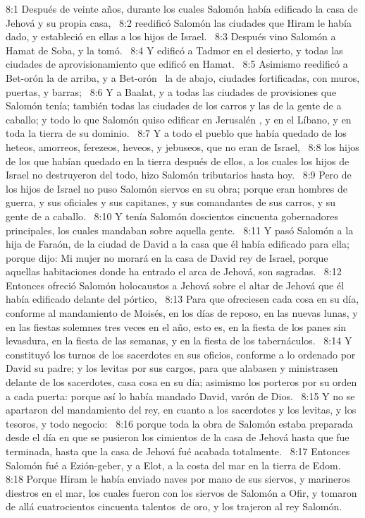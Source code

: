 								
								8:1 Después de veinte años, durante los cuales Salomón había edificado la casa de Jehová y su propia casa,  
								8:2 reedificó Salomón las ciudades que Hiram le había dado, y estableció en ellas a los hijos de Israel.  
								8:3 Después vino Salomón a Hamat de Soba, y la tomó.  
								8:4 Y edificó a Tadmor en el desierto, y todas las ciudades de aprovisionamiento que edificó en Hamat.  
								8:5 Asimismo reedificó a Bet-orón la de arriba, y a Bet-orón  la de abajo, ciudades fortificadas, con muros, puertas, y barras;  
								8:6 Y a Baalat, y a todas las ciudades de provisiones que Salomón tenía; también todas las ciudades de los carros y las de la gente de a caballo; y todo lo que Salomón quiso edificar en Jerusalén , y en el Líbano, y en toda la tierra de su dominio.  
								8:7 Y a todo el pueblo que había quedado de los heteos, amorreos, ferezeos, heveos, y jebuseos, que no eran de Israel,  
								8:8 los hijos de los que habían quedado en la tierra después de ellos, a los cuales los hijos de Israel no destruyeron del todo, hizo Salomón tributarios hasta hoy.  
								8:9 Pero de los hijos de Israel no puso Salomón siervos en su obra; porque eran hombres de guerra, y sus oficiales y sus capitanes, y sus comandantes de sus carros, y su gente de a caballo.  
								8:10 Y tenía Salomón doscientos cincuenta gobernadores principales, los cuales mandaban sobre aquella gente.  
								8:11 Y pasó Salomón a la hija de Faraón, de la ciudad de David a la casa que él había edificado para ella; porque dijo: Mi mujer no morará en la casa de David rey de Israel, porque aquellas habitaciones donde ha entrado el arca de Jehová, son sagradas.  
								8:12 Entonces ofreció Salomón holocaustos a Jehová sobre el altar de Jehová que él había edificado delante del pórtico,  
								8:13 Para que ofreciesen cada cosa en su día, conforme al mandamiento de Moisés, en los días de reposo, en las nuevas lunas, y en las fiestas solemnes tres veces en el año, esto es, en la fiesta de los panes sin levasdura, en la fiesta de las semanas, y en la fiesta de los tabernáculos.  
								8:14 Y constituyó los turnos de los sacerdotes en sus oficios, conforme a lo ordenado por David su padre; y los levitas por sus cargos, para que alabasen y ministrasen delante de los sacerdotes, casa cosa en su día; asimismo los porteros por su orden a cada puerta: porque así lo había mandado David, varón de Dios.  
								8:15 Y no se apartaron del mandamiento del rey, en cuanto a los sacerdotes y los levitas, y los tesoros, y todo negocio:  
								8:16 porque toda la obra de Salomón estaba preparada desde el día en que se pusieron los cimientos de la casa de Jehová hasta que fue terminada, hasta que la casa de Jehová fué acabada totalmente.  
								8:17 Entonces Salomón fué a Ezión-geber, y a Elot, a la costa del mar en la tierra de Edom.  
								8:18 Porque Hiram le había enviado naves por mano de sus siervos, y marineros diestros en el mar, los cuales fueron con los siervos de Salomón a Ofir, y tomaron de allá cuatrocientos cincuenta talentos de oro, y los trajeron al rey Salomón.  

